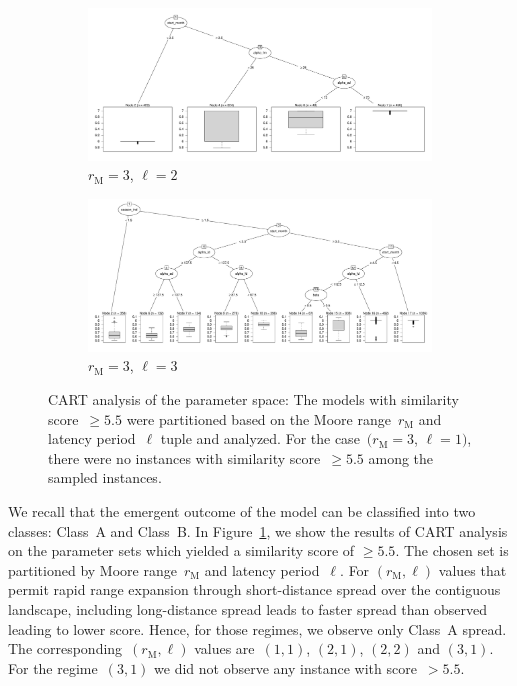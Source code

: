 \documentclass[10pt]{article}
\theoremstyle{definition}
\newcommand{\mooreRange}{r_\mathrm{M}}
\begin{document}
\begin{figure}[!ht]
\begin{subfigure}[b]{.45\textwidth}
    \end{subfigure}
    \begin{subfigure}[b]{.45\textwidth}
\includegraphics[width=\textwidth,trim={1cm 1cm 1cm 0cm},clip]{../cellular_automata/results/cart/m3_l2_tree.pdf}
\caption{$\mooreRange=3$, $\ell=2$}
    \end{subfigure}
    \begin{subfigure}[b]{.45\textwidth}
\includegraphics[width=\textwidth,trim={1cm 1cm 1cm 0cm},clip]{../cellular_automata/results/cart/m3_l3_tree.pdf}
\caption{$\mooreRange=3$, $\ell=3$}
    \end{subfigure}
    \caption{CART analysis of the parameter space: The models with
        similarity score~$\ge5.5$ were partitioned based on the Moore
    range~$\mooreRange$ and latency period~$\ell$ tuple and analyzed. For
 the case~$(\mooreRange=3$, $\ell=1)$, there were no instances with
 similarity score~$\ge5.5$ among the sampled instances. 
    \label{fig:cart}}
\end{figure}

We recall that the emergent outcome of the model can be classified into two
classes: Class~A and Class~B. In Figure~\ref{fig:cart}, we show the results
of CART analysis on the parameter sets which yielded a similarity score of
$\ge5.5$. The chosen set is partitioned by Moore range~$\mooreRange$ and
latency period~$\ell$. For $(\mooreRange,\ell)$ values that permit rapid
range expansion through short-distance spread over the contiguous
landscape, including long-distance spread leads to faster spread than
observed leading to lower score. Hence, for those regimes, we
observe only Class~A spread. The corresponding~$(\mooreRange,\ell)$ values
are~$(1,1)$, $(2,1)$, $(2,2)$ and $(3,1)$. For the regime~$(3,1)$ we did
not observe any instance with score~$>5.5$.
\end{document}
